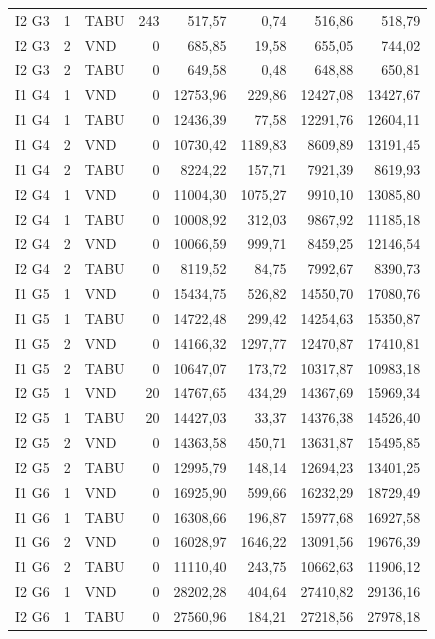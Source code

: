 \begin{longtable}{lrlrrrrr}
I2 G3 & 1 & TABU & 243 & 517,57 & 0,74 & 516,86 & 518,79 \\
I2 G3 & 2 & VND & 0 & 685,85 & 19,58 & 655,05 & 744,02 \\
I2 G3 & 2 & TABU & 0 & 649,58 & 0,48 & 648,88 & 650,81 \\
I1 G4 & 1 & VND & 0 & 12753,96 & 229,86 & 12427,08 & 13427,67 \\
I1 G4 & 1 & TABU & 0 & 12436,39 & 77,58 & 12291,76 & 12604,11 \\
I1 G4 & 2 & VND & 0 & 10730,42 & 1189,83 & 8609,89 & 13191,45 \\
I1 G4 & 2 & TABU & 0 & 8224,22 & 157,71 & 7921,39 & 8619,93 \\
I2 G4 & 1 & VND & 0 & 11004,30 & 1075,27 & 9910,10 & 13085,80 \\
I2 G4 & 1 & TABU & 0 & 10008,92 & 312,03 & 9867,92 & 11185,18 \\
I2 G4 & 2 & VND & 0 & 10066,59 & 999,71 & 8459,25 & 12146,54 \\
I2 G4 & 2 & TABU & 0 & 8119,52 & 84,75 & 7992,67 & 8390,73 \\
I1 G5 & 1 & VND & 0 & 15434,75 & 526,82 & 14550,70 & 17080,76 \\
I1 G5 & 1 & TABU & 0 & 14722,48 & 299,42 & 14254,63 & 15350,87 \\
I1 G5 & 2 & VND & 0 & 14166,32 & 1297,77 & 12470,87 & 17410,81 \\
I1 G5 & 2 & TABU & 0 & 10647,07 & 173,72 & 10317,87 & 10983,18 \\
I2 G5 & 1 & VND & 20 & 14767,65 & 434,29 & 14367,69 & 15969,34 \\
I2 G5 & 1 & TABU & 20 & 14427,03 & 33,37 & 14376,38 & 14526,40 \\
I2 G5 & 2 & VND & 0 & 14363,58 & 450,71 & 13631,87 & 15495,85 \\
I2 G5 & 2 & TABU & 0 & 12995,79 & 148,14 & 12694,23 & 13401,25 \\
I1 G6 & 1 & VND & 0 & 16925,90 & 599,66 & 16232,29 & 18729,49 \\
I1 G6 & 1 & TABU & 0 & 16308,66 & 196,87 & 15977,68 & 16927,58 \\
I1 G6 & 2 & VND & 0 & 16028,97 & 1646,22 & 13091,56 & 19676,39 \\
I1 G6 & 2 & TABU & 0 & 11110,40 & 243,75 & 10662,63 & 11906,12 \\
I2 G6 & 1 & VND & 0 & 28202,28 & 404,64 & 27410,82 & 29136,16 \\
I2 G6 & 1 & TABU & 0 & 27560,96 & 184,21 & 27218,56 & 27978,18 \\

\end{longtable}
